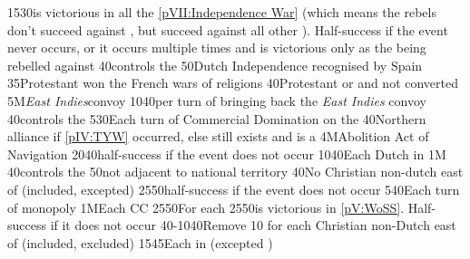 %
%
{15}{30}{\SPA is victorious in all the \ref{pVII:Independence War} (which
  means the rebels don't succeed against \SPA, but succeed against all other
  \MAJ). Half-success if the event never occurs, or it occurs multiple times
  and \SPA is victorious only as the \MAJ being rebelled against }%
%
 
%
%
{}{40}{\paysmajeurHollande controls the }%
%
%
{}{50}{Dutch Independence recognised by Spain}%
%
%
{}{35}{Protestant won the French wars of religions}%
%
%
{}{40}{\paysmajeurAngleterre Protestant or \PROTANG and not converted}%
%
\EUobjective5M{\emph{East Indies}}{convoy}%
{10}{40}{per turn of bringing back the \emph{East Indies} convoy}%
%
%
%
{}{40}{\paysmajeurHollande controls the }%
%
%
{5}{30}{Each turn of Commercial Domination on the }%
%
%
{}{40}{Northern \HRE alliance if \ref{pIV:TYW} occurred, else \payshanse still
  exists and is a \VASSAL}%
%
\EUobjective4M{Abolition Act of Navigation}{}%
{20}{40}{half-success if the event does not occur}%
%
%
{10}{40}{Each Dutch \COL in \continentBrazil}%
%
%
\EUobjective1M{}{}%
{}{40}{\paysmajeurHollande controls the }%
%
%
{}{50}{\paysmajeurFrance not adjacent to \paysmajeurHollande national
  territory}%
%
%
{}{40}{No Christian non-dutch \TP east of \granderegionMalacca (included,
  \continentSiberia excepted)}%
%
%
{25}{50}{half-success if the event does not occur}%
%
%
{5}{40}{Each turn of  monopoly}%
%
%
\EUobjective1M{Each \CC}{CC}%
{25}{50}{For each }%
%
%
{25}{50}{\HOL is victorious in \ref{pV:WoSS}. Half-success if it does not
  occur}%
%
%
{40-10}{40}{Remove 10 \VPs for each Christian non-Dutch \TP east of
   (included, \continentSiberia excluded)}%
%
%
{15}{45}{Each \COL in  (excepted )}%
